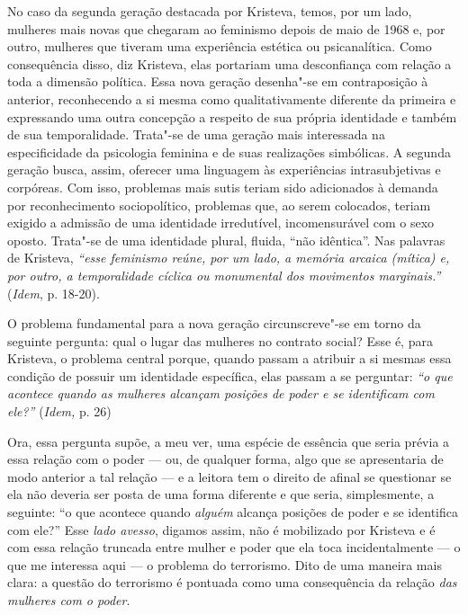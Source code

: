 No caso da segunda geração destacada por Kristeva, temos, por um lado,
mulheres mais novas que chegaram ao feminismo depois de maio de 1968 e,
por outro, mulheres que tiveram uma experiência estética ou
psicanalítica. Como consequência disso, diz Kristeva, elas portariam uma
desconfiança com relação a toda a dimensão política. Essa nova geração
desenha"-se em contraposição à anterior, reconhecendo a si mesma como
qualitativamente diferente da primeira e expressando uma outra concepção
a respeito de sua própria identidade e também de sua temporalidade.
Trata"-se de uma geração mais interessada na especificidade da psicologia
feminina e de suas realizações simbólicas. A segunda geração busca,
assim, oferecer uma linguagem às experiências intrasubjetivas e
corpóreas. Com isso, problemas mais sutis teriam sido adicionados à
demanda por reconhecimento sociopolítico, problemas que, ao serem
colocados, teriam exigido a admissão de uma identidade irredutível,
incomensurável com o sexo oposto. Trata"-se de uma identidade plural,
fluida, ``não idêntica''. Nas palavras de Kristeva, \emph{``esse
feminismo reúne, por um lado, a memória arcaica (mítica) e, por outro, a
temporalidade cíclica ou monumental dos movimentos marginais.''}
(\emph{Idem}, p. 18-20).

O problema fundamental para a nova geração circunscreve"-se em torno da
seguinte pergunta: qual o lugar das mulheres no contrato social? Esse é,
para Kristeva, o problema central porque, quando passam a atribuir a si
mesmas essa condição de possuir um identidade específica, elas passam a
se perguntar: \emph{``o que acontece quando as mulheres alcançam
posições de poder e se identificam com ele?''} (\emph{Idem,} p. 26)

Ora, essa pergunta supõe, a meu ver, uma espécie de essência que seria
prévia a essa relação com o poder --- ou, de qualquer forma, algo que se
apresentaria de modo anterior a tal relação --- e a leitora tem o direito
de afinal se questionar se ela não deveria ser posta de uma forma
diferente e que seria, simplesmente, a seguinte: ``o que acontece quando
\emph{alguém} alcança posições de poder e se identifica com ele?'' Esse
\emph{lado avesso}, digamos assim, não é mobilizado por Kristeva e é com
essa relação truncada entre mulher e poder que ela toca incidentalmente
--- o que me interessa aqui --- o problema do terrorismo. Dito de uma
maneira mais clara: a questão do terrorismo é pontuada como uma
consequência da relação \emph{das mulheres com o poder}.

